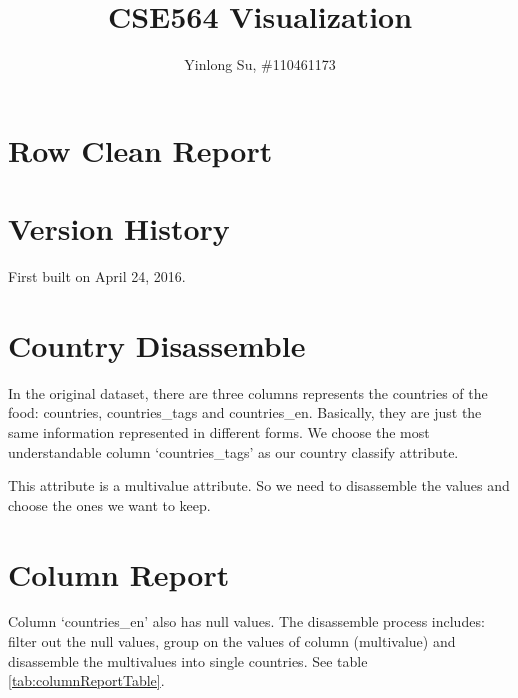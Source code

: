 \documentclass[11pt]{article}
\begin{document}
\title{CSE564 Visualization}
\author{Yinlong Su, \#110461173}
\maketitle

\section*{Row Clean Report}

\setcounter{section}{-1}
\section{Version History}

First built on April 24, 2016.

\section{Country Disassemble}

In the original dataset, there are three columns represents the countries of the food: countries, countries\_tags and countries\_en. Basically, they are just the same information represented in different forms. We choose the most understandable column `countries\_tags' as our country classify attribute.
\par
This attribute is a multivalue attribute. So we need to disassemble the values and choose the ones we want to keep.

\section{Column Report}

Column `countries\_en' also has null values. The disassemble process includes: filter out the null values, group on the values of column (multivalue) and disassemble the multivalues into single countries. See table \ref{tab:columnReportTable}.
\end{document}
